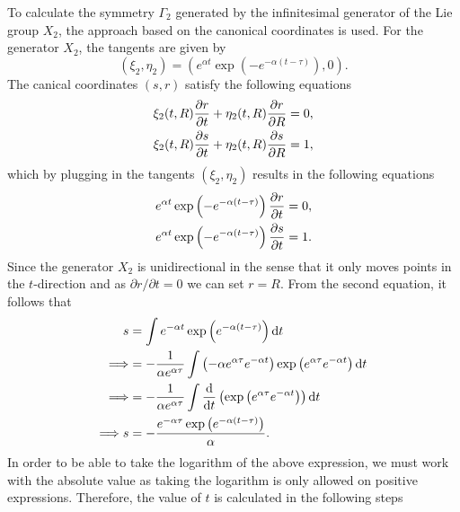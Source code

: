To calculate the symmetry $\Gamma_2$ generated by the infinitesimal generator of the Lie group $X_2$, the approach based on the canonical coordinates is used. For the generator $X_2$, the tangents are given by
$$\left(\xi_2,\eta_2\right)=\left(e^{\alpha t}\exp\left(-e^{-\alpha(t-\tau)}\right),0\right).$$
The canical coordinates $(s,r)$ satisfy the following equations 
\begin{align*}
\xi_{2}(t,R)\pdv{r}{t}+\eta_{2}(t,R)\pdv{r}{R}&=0,\\
\xi_{2}(t,R)\pdv{s}{t}+\eta_{2}(t,R)\pdv{s}{R}&=1,\\
\end{align*}
which by plugging in the tangents $\left(\xi_2,\eta_2\right)$ results in the following equations
\begin{align*}
e^{\alpha t}\exp\left(-e^{-\alpha(t-\tau)}\right)\pdv{r}{t}&=0,\\
e^{\alpha t}\exp\left(-e^{-\alpha(t-\tau)}\right)\pdv{s}{t}&=1.\\
\end{align*}
Since the generator $X_2$ is unidirectional in the sense that it only moves points in the $t$-direction and as $\partial r/\partial t=0$ we can set $r=R$. From the second equation, it follows that
\begin{align*}
  s&=\int e^{-\alpha t}\exp\left(e^{-\alpha(t-\tau)}\right)\dd t\\
  \Longrightarrow&=-\dfrac{1}{\alpha e^{\alpha\tau}}\int \left(-\alpha e^{\alpha\tau}e^{-\alpha t}\right)\exp\left(e^{\alpha\tau}e^{-\alpha t}\right)\dd t\\
  \Longrightarrow &= -\dfrac{1}{\alpha e^{\alpha\tau}}\int \dv{}{t}\left(\exp\left(e^{\alpha\tau}e^{-\alpha t}\right)\right)\dd t\\
  \Longrightarrow s&=-\dfrac{e^{-\alpha\tau}\exp\left(e^{-\alpha(t-\tau)}\right)}{\alpha}.
\end{align*}
In order to be able to take the logarithm of the above expression, we must work with the absolute value as taking the logarithm is only allowed on positive expressions. Therefore, the value of $t$ is calculated in the following steps



